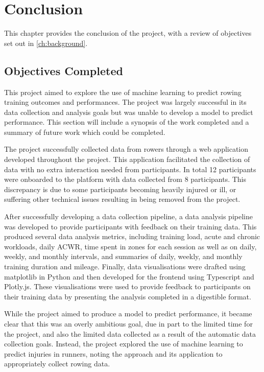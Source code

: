 \chapter{Conclusion}
This chapter provides the conclusion of the project, with a review of objectives set out in \ref{ch:background}.


\section{Objectives Completed}
This project aimed to explore the use of machine learning to predict rowing training outcomes and performances. The project was largely successful in its data collection and analysis goals but was unable to develop a model to predict performance. This section will include a synopsis of the work completed and a summary of future work which could be completed. 

The project successfully collected data from rowers through a web application developed throughout the project. This application facilitated the collection of data with no extra interaction needed from participants. In total 12 participants were onboarded to the platform with data collected from 8 participants. This discrepancy is due to some participants becoming heavily injured or ill, or suffering other technical issues resulting in being removed from the project. 

After successfully developing a data collection pipeline, a data analysis pipeline was developed to provide participants with feedback on their training data. This produced several data analysis metrics, including training load, acute and chronic workloads, daily ACWR, time spent in zones for each session as well as on daily, weekly, and monthly intervals, and summaries of daily, weekly, and monthly training duration and mileage. Finally, data visualisations were drafted using matplotlib in Python and then developed for the frontend using Typescript and Plotly.js. These visualisations were used to provide feedback to participants on their training data by presenting the analysis completed in a digestible format.

While the project aimed to produce a model to predict performance, it became clear that this was an overly ambitious goal, due in part to the limited time for the project, and also the limited data collected as a result of the automatic data collection goals. Instead, the project explored the use of machine learning to predict injuries in runners, noting the approach and its application to appropriately collect rowing data.

